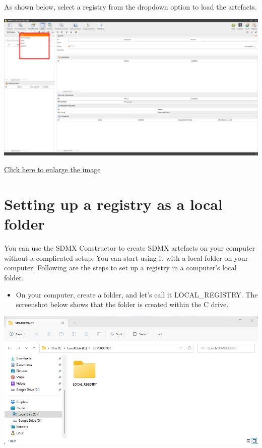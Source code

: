 \documentclass[
]{book}
\providecommand{\tightlist}{%
  \setlength{\itemsep}{0pt}\setlength{\parskip}{0pt}}
\theoremstyle{definition}
\theoremstyle{definition}
\theoremstyle{definition}
\theoremstyle{definition}
\theoremstyle{remark}
\begin{document}
As shown below, select a registry from the dropdown option to load the artefacts.

\begin{center}\includegraphics[width=1\linewidth]{./images/image046} \end{center}

\href{images/image046.png}{Click here to enlarge the image}

\hypertarget{setting-up}{%
\section{Setting up a registry as a local folder}\label{setting-up}}

You can use the SDMX Constructor to create SDMX artefacts on your computer without a complicated setup. You can start using it with a local folder on your computer. Following are the steps to set up a registry in a computer's local folder.

\begin{itemize}
\tightlist
\item
  On your computer, create a folder, and let's call it LOCAL\_REGISTRY. The screenshot below shows that the folder is created within the C drive.
\end{itemize}

\begin{center}\includegraphics[width=1\linewidth]{./images/image048} \end{center}
\end{document}
